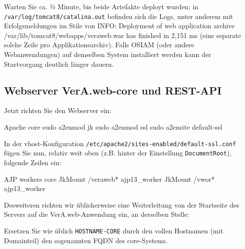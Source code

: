 \documentclass{tarentanleitung}
\begin{document}
Warten Sie ca. ½ Minute, bis beide Artefakte deployt wurden; in
\texttt{/var/log/tomcat8/catalina.out} befinden sich die Logs,
unter anderem mit Erfolgsmeldungen im Stile von {\ttfamily
INFO: Deployment of web application archive
/var/lib/tomcat8/webapps/veraweb.war has finished in 2,151 ms}
(eine separate solche Zeile pro Applikationsarchiv).
Falls OSIAM (oder andere Webanwendungen) auf demselben System
installiert werden kann der Startvorgang deutlich länger dauern.


\subsection{Webserver VerA.web-core und REST-API}\label{subsec:setup-core-apache}

\begin{minipage}{\linewidth}
Jetzt richten Sie den Webserver ein:

\begin{lstdump}{Apache core}
sudo a2enmod jk
sudo a2enmod ssl
sudo a2ensite default-ssl
\end{lstdump}
\end{minipage}

\begin{minipage}{\linewidth}
In der vhost-Konfiguration \texttt{/etc/apache2/sites-enabled/default-ssl.conf}
fügen Sie nun, relativ weit oben (z.B. hinter der Einstellung
\texttt{DocumentRoot}), folgende Zeilen ein:

\begin{lstdump}{AJP workers core}
JkMount /veraweb* ajp13_worker
JkMount /vwor* ajp13_worker
\end{lstdump}
\end{minipage}

\begin{minipage}{\linewidth}
Desweiteren richten wir üblicherweise eine Weiterleitung von der
Startseite des Servers auf die VerA.web-Anwendung ein, an derselben Stelle:

\end{minipage}

Ersetzen Sie wie üblich \texttt{HOSTNAME-CORE} durch den vollen
Hostnamen (mit Domainteil) \dash den sogenannten FQDN \dash des
core-Systems.
\end{document}
